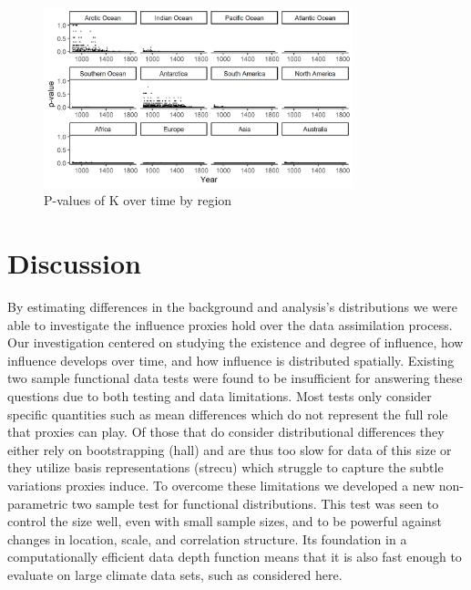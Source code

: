 \documentclass[12pt]{article}
\begin{document}
\begin{figure}
	\begin{center}
    \includegraphics[width=0.80\textwidth,valign=c]{results/pval_region.png}
    \caption{P-values of K over time by region}
    \label{pvalregion}
    \end{center}
\end{figure}


\section{Discussion} \label{discussion}
By estimating differences in the background and analysis's distributions we were able to investigate the influence proxies hold over the data assimilation process. Our investigation centered on studying the existence and degree of influence, how influence develops over time, and how influence is distributed spatially. Existing two sample functional data tests were found to be insufficient for answering these questions due to both testing and data limitations. Most tests only consider specific quantities such as mean differences which do not represent the full role that proxies can play. Of those that do consider distributional differences they either rely on bootstrapping (hall) and are thus too slow for data of this size or they utilize basis representations (strecu) which struggle to capture the subtle variations proxies induce. To overcome these limitations we developed a new non-parametric two sample test for functional distributions. This test was seen to control the size well, even with small sample sizes, and to be powerful against changes in location, scale, and correlation structure. Its foundation in a computationally efficient data depth function means that it is also fast enough to evaluate on large climate data sets, such as considered here.
\end{document}
